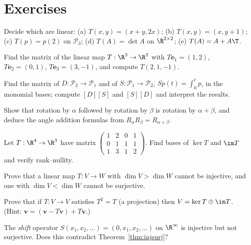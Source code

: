 \section{Exercises}

\begin{exercise}
Decide which are linear: (a) $T(x,y)=(x+y,2x)$; (b) $T(x,y)=(x,y+1)$; (c) $T(p)=p(2)$ on $\mathcal{P}_3$; (d) $T(A)=\det A$ on $\R^{2\times2}$; (e) $T(A)=A+A\T$.
\end{exercise}

\begin{exercise}
Find the matrix of the linear map $T:\R^3\to\R^2$ with $T\mathbf{e}_1=(1,2)$, $T\mathbf{e}_2=(0,1)$, $T\mathbf{e}_3=(3,-1)$, and compute $T(2,1,-1)$.
\end{exercise}

\begin{exercise}
Find the matrix of $D:\mathcal{P}_2\to\mathcal{P}_1$ and of $S:\mathcal{P}_1\to\mathcal{P}_2$, $Sp(t)=\int_0^tp$, in the monomial bases; compute $[D][S]$ and $[S][D]$ and interpret the results.
\end{exercise}

\begin{exercise}
Show that rotation by $\alpha$ followed by rotation by $\beta$ is rotation by $\alpha+\beta$, and deduce the angle addition formulas from $R_\alpha R_\beta=R_{\alpha+\beta}$.
\end{exercise}

\begin{exercise}
Let $T:\R^4\to\R^3$ have matrix $\begin{pmatrix}1&2&0&1\\0&1&1&1\\1&3&1&2\end{pmatrix}$. Find bases of $\ker T$ and $\im T$ and verify rank--nullity.
\end{exercise}

\begin{exercise}
Prove that a linear map $T:V\to W$ with $\dim V>\dim W$ cannot be injective, and one with $\dim V<\dim W$ cannot be surjective.
\end{exercise}

\begin{exercise}
Prove that if $T:V\to V$ satisfies $T^2=T$ (a projection) then $V=\ker T\oplus\im T$. (Hint: $\mathbf{v}=(\mathbf{v}-T\mathbf{v})+T\mathbf{v}$.)
\end{exercise}

\begin{exercise}
The \emph{shift} operator $S(x_1,x_2,\dots)=(0,x_1,x_2,\dots)$ on $\R^\infty$ is injective but not surjective. Does this contradict Theorem~\ref{thm:injsurj}?
\end{exercise}
